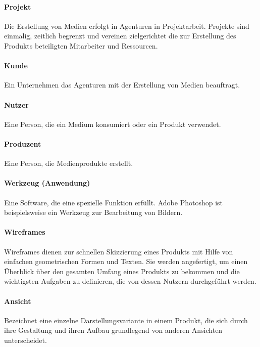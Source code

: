 \paragraph{Projekt} Die Erstellung von Medien erfolgt in Agenturen in Projektarbeit. Projekte sind einmalig, zeitlich begrenzt und vereinen zielgerichtet die zur Erstellung des Produkts beteiligten Mitarbeiter und Ressourcen. 

\paragraph{Kunde} Ein Unternehmen das Agenturen mit der Erstellung von Medien beauftragt.

\paragraph{Nutzer} Eine Person, die ein Medium konsumiert oder ein Produkt verwendet.

\paragraph{Produzent} Eine Person, die Medienprodukte erstellt.

\paragraph{Werkzeug (Anwendung)} Eine Software, die eine spezielle Funktion erfüllt. Adobe Photoshop ist beispielsweise ein Werkzeug zur Bearbeitung von Bildern.

\paragraph{Wireframes} Wireframes dienen zur schnellen Skizzierung eines Produkts mit Hilfe von einfachen geometrischen Formen und Texten. Sie werden angefertigt, um einen Überblick über den gesamten Umfang eines Produkts zu bekommen und die wichtigsten Aufgaben zu definieren, die von dessen Nutzern durchgeführt werden.

\paragraph{Ansicht} Bezeichnet eine einzelne Darstellungsvariante in einem Produkt, die sich durch ihre Gestaltung und ihren Aufbau grundlegend von anderen Ansichten unterscheidet.

\pagebreak